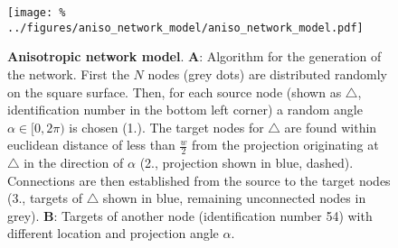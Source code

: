 
\begin{figure}[h]
  \vspace{0.25cm}
  \centering
  \texttt{[image: \%
    ../figures/aniso\_network\_model/aniso\_network\_model.pdf]} %
  \vspace{0.1cm}
\caption{{\bf Anisotropic network model}. \textbf{A}: Algorithm for the
  generation of the network. First the $N$ nodes (grey dots) are
  distributed randomly on the square surface. Then, for each source
  node (shown as $\bigtriangleup$, identification number in the bottom left
  corner) a random angle $\alpha \in [0,2\pi)$ is chosen (1.). The
  target nodes for $\bigtriangleup$ are found within euclidean distance of
  less than $\frac{w}{2}$ from the projection originating at $\bigtriangleup$
  in the direction of $\alpha$ (2., projection shown in blue,
  dashed). Connections are then established from the source to the
  target nodes (3., targets of $\bigtriangleup$ shown in blue, remaining
  unconnected nodes in grey). \textbf{B}: Targets of another node
  (identification number 54) with different location and projection
  angle $\alpha$.}
\label{fig:aniso_net}
\end{figure}
